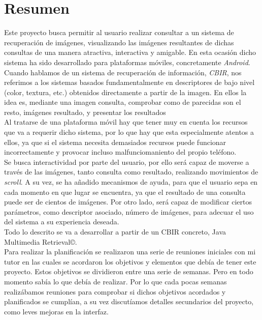 \chapter{Resumen}
\label{cap:resumen}

Este proyecto busca permitir al usuario realizar consultar a un sistema de recuperación de imágenes, visualizando las imágenes resultantes de dichas consultas de una manera atractiva, interactiva y amigable. En esta ocasión dicho sistema ha sido desarrollado para plataformas móviles, concretamente \textit{Android}.\\

Cuando hablamos de un sistema de recuperación de información, \textit{CBIR}, nos referimos a los sistemas basados fundamentalmente en descriptores de bajo nivel (color, textura, etc.) obtenidos directamente a partir de la imagen. En ellos la idea es, mediante una imagen consulta, comprobar como de parecidas son el resto, imágenes resultado, y presentar los resultados\\

Al tratarse de una plataforma móvil hay que tener muy en cuenta los recursos que va a requerir dicho sistema, por lo que hay que esta especialmente atentos a ellos, ya que si el sistema necesita demasiados recursos puede funcionar incorrectamente y provocar incluso malfunciomaniento del propio teléfono.\\

Se busca interactividad por parte del usuario, por ello será capaz de moverse a través de las imágenes, tanto consulta como resultado, realizando movimientos de \textit{scroll}. A su vez, se ha añadido mecanismos de ayuda, para que el usuario sepa en cada momento en que lugar se encuentra, ya que el resultado de una consulta puede ser de cientos de imágenes. Por otro lado, será capaz de modificar ciertos parámetros, como descriptor asociado, número de imágenes, para adecuar el uso del sistema a su experiencia deseada.\\

Todo lo descrito se va a desarrollar a partir de un CBIR concreto, Java Multimedia Retrieval©.\\ 

Para realizar la planificación se realizaron una serie de reuniones iniciales con mi tutor en las cuales se acordaron los objetivos y elementos que debía de tener este proyecto. Estos objetivos se dividieron entre una serie de semanas. Pero en todo momento sabía lo que debía de realizar. Por lo que cada pocas semanas realizábamos reuniones para comprobar si dichos objetivos acordados y planificados se cumplían, a su vez discutíamos detalles secundarios del proyecto, como leves mejoras en la interfaz.\\

